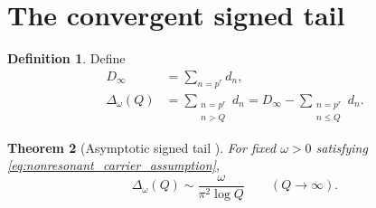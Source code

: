 \documentclass[11pt]{amsart}
\numberwithin{equation}{section}
\theoremstyle{plain}
\newtheorem{theorem}{Theorem}[section]
\theoremstyle{definition}
\newtheorem{definition}[theorem]{Definition}
\theoremstyle{remark}
\newcommand{\1}{\mathbf{1}}
\begin{document}
\section{The convergent signed tail}
\label{sec:signed_tail}

\begin{definition}
\label{def:Delta}
Define
\begin{align}
D_\infty
&=
\sum_{n=p^r}d_n,
\label{eq:D_infinity}
\\
\Delta_\omega(Q)
&=
\sum_{\substack{n=p^r\\n>Q}}d_n
=
D_\infty-\sum_{\substack{n=p^r\\n\leq Q}}d_n.
\label{eq:Delta_definition}
\end{align}
\end{definition}


\begin{theorem}[Asymptotic signed tail {}]
\label{thm:Delta_asymptotic}
For fixed \(\omega>0\) satisfying
\eqref{eq:nonresonant_carrier_assumption},
\begin{equation}
\boxed{
\Delta_\omega(Q)
\sim
\frac{\omega}{\pi^2\log Q}
\qquad(Q\to\infty).
}
\label{eq:Delta_asymptotic}
\end{equation}
\end{theorem}
\end{document}
